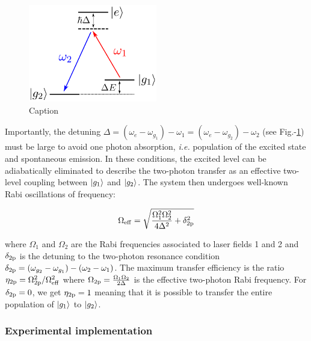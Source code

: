 
\begin{figure}
    \centering
    \includegraphics[width=0.5\textwidth]{Fig/Chapter3/raman_level.png}
    \caption{Caption}
    \label{fig:raman_level}
\end{figure}


Importantly, the detuning $\Delta=(\omega_{e}-\omega_{g_1})-\omega_1=(\omega_{e}-\omega_{g_2})-\omega_2$ (see Fig.-\ref{fig:raman_level}) must be large to avoid one photon absorption, {\it i.e.} population of the excited state and spontaneous emission. In these conditions, the excited level can be adiabatically eliminated to describe the two-photon transfer as an effective two-level coupling between $\ket{g_1}$ and $\ket{g_2}$. The system then undergoes well-known Rabi oscillations of frequency:

\begin{equation}
    \Omega_{\rm{eff}}= \sqrt{\frac{\Omega_1^2 \Omega_2^2}{4 \Delta^2} + \delta_{\rm{2p}}^2}
\end{equation}

\noindent where $\Omega_1$ and $\Omega_2$ are the Rabi frequencies associated to laser fields 1 and 2 and $\delta_{\rm{2p}}$ is the detuning to the two-photon resonance condition $\delta_{\rm{2p}}=(\omega_{g_2} - \omega_{g_1}) - (\omega_2-\omega_1)$. The maximum transfer efficiency is the ratio $\eta_{\rm{2p}}=\Omega_{\rm{2p}}^2 /\Omega^2_{\rm{eff}}$ where $\Omega_{\rm{2p}}=\frac{\Omega_1 \Omega_2}{2 \Delta}$ is the effective two-photon Rabi frequency. For $\delta_{\rm{2p}}=0$, we get $\eta_{\rm{2p}}=1$ meaning that it is possible to transfer the entire population of $\ket{g_1}$ to $\ket{g_2}$.

\subsubsection{Experimental implementation}

